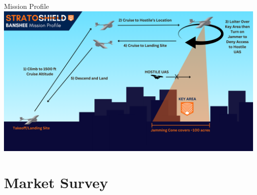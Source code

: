 \documentclass{beamer}
\newcommand{\setpresentername}[1]{\renewcommand{\presentername}{#1}}
\newcommand{\setpresentertitle}[1]{\renewcommand{\presentertitle}{#1}}
\newcommand{\presentername}{}
\newcommand{\presentertitle}{}
\begin{document}
    \begin{frame}{Mission Profile}
        \centering
        \includegraphics[width=\textwidth]{figures/Mission Profile BANSHEE updated.png}
    \end{frame}

    \section{Market Survey}

    \setpresentername{Bradley Nordwall}
    \setpresentertitle{Lead CAD Engineer}
    
\end{document}
